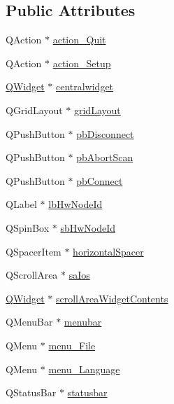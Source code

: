 \subsection*{Public Attributes}
\begin{DoxyCompactItemize}
\item 
Q\-Action $\ast$ \hyperlink{class_ui__mdt_modbus_io_tool_a1a8b372c8e609cd2a0b59298002ab3db}{action\-\_\-\-Quit}
\item 
Q\-Action $\ast$ \hyperlink{class_ui__mdt_modbus_io_tool_a1e0b957f5e299ea57754889bf0a670ca}{action\-\_\-\-Setup}
\item 
\hyperlink{class_q_widget}{Q\-Widget} $\ast$ \hyperlink{class_ui__mdt_modbus_io_tool_a444ded6af2f013d65668cefc2159b0f9}{centralwidget}
\item 
Q\-Grid\-Layout $\ast$ \hyperlink{class_ui__mdt_modbus_io_tool_a789ef6fb3f339bf1b6e982f7a7ba5b52}{grid\-Layout}
\item 
Q\-Push\-Button $\ast$ \hyperlink{class_ui__mdt_modbus_io_tool_ab2afd7755226736210df8078d253fd78}{pb\-Disconnect}
\item 
Q\-Push\-Button $\ast$ \hyperlink{class_ui__mdt_modbus_io_tool_a60a00c62dd6ba2fa09f0100aa27e8534}{pb\-Abort\-Scan}
\item 
Q\-Push\-Button $\ast$ \hyperlink{class_ui__mdt_modbus_io_tool_a68bab4d7e93a5f3d171b3b72957f1fd0}{pb\-Connect}
\item 
Q\-Label $\ast$ \hyperlink{class_ui__mdt_modbus_io_tool_ac3edc57c24eb8f2d37e0374959fdffa7}{lb\-Hw\-Node\-Id}
\item 
Q\-Spin\-Box $\ast$ \hyperlink{class_ui__mdt_modbus_io_tool_ac67713d504ef59d0fefa6da5ca05452c}{sb\-Hw\-Node\-Id}
\item 
Q\-Spacer\-Item $\ast$ \hyperlink{class_ui__mdt_modbus_io_tool_a66418b60c043ae70465930e69e88e63b}{horizontal\-Spacer}
\item 
Q\-Scroll\-Area $\ast$ \hyperlink{class_ui__mdt_modbus_io_tool_a0193061f662939b755bc31832269dd02}{sa\-Ios}
\item 
\hyperlink{class_q_widget}{Q\-Widget} $\ast$ \hyperlink{class_ui__mdt_modbus_io_tool_a624d93d5697ab5ba75269494cc888207}{scroll\-Area\-Widget\-Contents}
\item 
Q\-Menu\-Bar $\ast$ \hyperlink{class_ui__mdt_modbus_io_tool_a101030af93eae77dc80e69c6ad73b561}{menubar}
\item 
Q\-Menu $\ast$ \hyperlink{class_ui__mdt_modbus_io_tool_acfa5d67840ed8009e81284b8383cca18}{menu\-\_\-\-File}
\item 
Q\-Menu $\ast$ \hyperlink{class_ui__mdt_modbus_io_tool_a94583261b88e08ca386b793ff6133b0a}{menu\-\_\-\-Language}
\item 
Q\-Status\-Bar $\ast$ \hyperlink{class_ui__mdt_modbus_io_tool_a067095b9a1197506ba66e11e40f195fb}{statusbar}
\end{DoxyCompactItemize}


